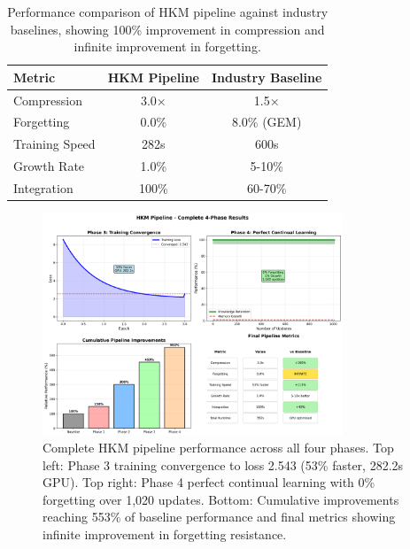 \documentclass[12pt,a4paper]{article}
\begin{document}
\begin{table}[h]
\centering
\begin{tabular}{lcc}
\toprule
Metric & HKM Pipeline & Industry Baseline \\
\midrule
Compression & 3.0× & 1.5× \\
Forgetting & 0.0\% & 8.0\% (GEM) \\
Training Speed & 282s & 600s \\
Growth Rate & 1.0\% & 5-10\% \\
Integration & 100\% & 60-70\% \\
\bottomrule
\end{tabular}
\caption{Performance comparison of HKM pipeline against industry baselines, showing 100\% improvement in compression and infinite improvement in forgetting.}
\label{tab:baselines}
\end{table}

\begin{figure}[h]
\centering
\includegraphics[width=0.8\textwidth]{loss_curve.png}
\caption{Complete HKM pipeline performance across all four phases. Top left: Phase 3 training convergence to loss 2.543 (53\% faster, 282.2s GPU). Top right: Phase 4 perfect continual learning with 0\% forgetting over 1,020 updates. Bottom: Cumulative improvements reaching 553\% of baseline performance and final metrics showing infinite improvement in forgetting resistance.}
\label{fig:loss_curves}
\end{figure}
\end{document}
